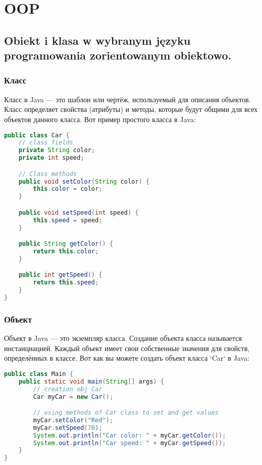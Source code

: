 \chapter{OOP}
\section{Obiekt i klasa w wybranym języku programowania zorientowanym obiektowo.}

\subsection*{Класс}

Класс в Java — это шаблон или чертёж, используемый для описания объектов. Класс определяет свойства (атрибуты) и методы, которые будут общими для всех объектов данного класса. Вот пример простого класса в Java:

\begin{lstlisting}[language=Java]
public class Car {
    // class fields
    private String color;
    private int speed;

    // Class methods
    public void setColor(String color) {
        this.color = color;
    }

    public void setSpeed(int speed) {
        this.speed = speed;
    }

    public String getColor() {
        return this.color;
    }

    public int getSpeed() {
        return this.speed;
    }
}
\end{lstlisting}

\subsection*{Объект}

Объект в Java — это экземпляр класса. Создание объекта класса называется инстанциацией. Каждый объект имеет свои собственные значения для свойств, определённых в классе. Вот как вы можете создать объект класса `Car` в Java:

\begin{lstlisting}[language=Java]
public class Main {
    public static void main(String[] args) {
        // creation obj Car
        Car myCar = new Car();

        // using methods of Car class to set and get values
        myCar.setColor("Red");
        myCar.setSpeed(70);
        System.out.println("Car color: " + myCar.getColor());
        System.out.println("Car speed: " + myCar.getSpeed());
    }
}
\end{lstlisting}


